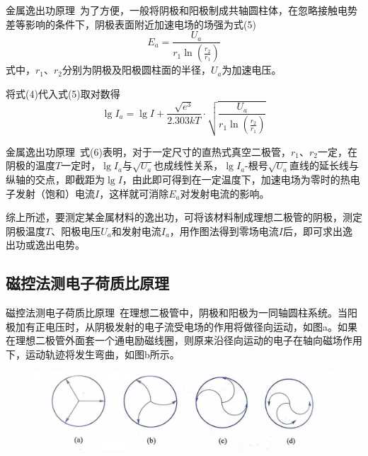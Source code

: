 \documentclass{beamer}
\begin{document}
    \begin{frame}{金属逸出功原理}{\thesubsection \, \subsecname}
        为了方便，一般将阴极和阳极制成共轴圆柱体，在忽略接触电势差等影响的条件下，阴极表面附近加速电场的场强为式(5)
        \begin{equation}
            E_a = \frac{U_a}{r_1\ln(\frac{r_2}{r_1})}
        \end{equation}
        式中，$r_1$、$r_2$分别为阴极及阳极圆柱面的半径，$U_a$为加速电压。

        将式(4)代入式(5)取对数得
        \begin{equation}
            \lg I_a = \lg I + \frac{\sqrt{e^3}}{2.303kT}\cdot \sqrt{\frac{U_a}{r_1\ln(\frac{r_2}{r_1})}}
        \end{equation}
    \end{frame}

    \begin{frame}{金属逸出功原理}{\thesubsection \, \subsecname}
        式(6)表明，对于一定尺寸的直热式真空二极管，$r_1$、$r_2$一定，在阴极的温度$T$一定时，$\lg I_a$与$\sqrt{U_a}$也成线性关系，$\lg I_a$-根号$\sqrt{U_a}$直线的延长线与纵轴的交点，即截距为$\lg I$，由此即可得到在一定温度下，加速电场为零时的热电子发射（饱和）电流$I$，这样就可消除$E_a$对发射电流的影响。
    
        综上所述，要测定某金属材料的逸出功，可将该材料制成理想二极管的阴极，测定阴极温度$T$、阳极电压$U_a$和发射电流$I_a$，用作图法得到零场电流$I$后，即可求出逸出功或逸出电势。
    \end{frame}

    \subsection{磁控法测电子荷质比原理}

    \begin{frame}{磁控法测电子荷质比原理}{\thesubsection \, \subsecname}
        在理想二极管中，阴极和阳极为一同轴圆柱系统。当阳极加有正电压时，从阴极发射的电子流受电场的作用将做径向运动，如图a。如果在理想二极管外面套一个通电励磁线圈，则原来沿径向运动的电子在轴向磁场作用下，运动轨迹将发生弯曲，如图b所示。
        \begin{figure}[htbp]
            \centering
            \includegraphics[scale=0.7]{gallery/pic2.jpg}
        \end{figure}
    \end{frame}
\end{document}

